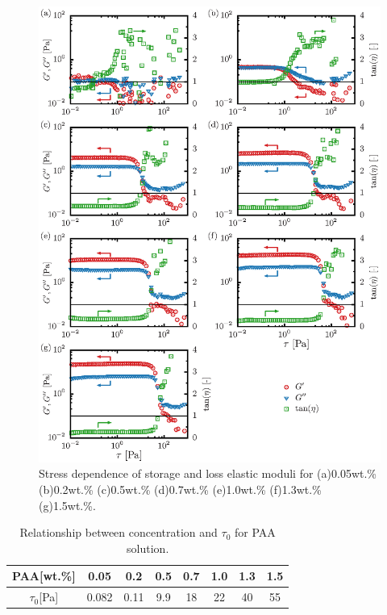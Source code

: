 \begin{figure}[ht]
	\centering
	\includegraphics[width=1\textwidth]{3-Physical_Property/elastic_modulus.eps}
	\caption{Stress dependence of storage and loss elastic moduli for (a)0.05wt.\% (b)0.2wt.\% (c)0.5wt.\% (d)0.7wt.\% (e)1.0wt.\% (f)1.3wt.\% (g)1.5wt.\%.}
	\label{fig:PAA-elast}
\end{figure}

\begin{table}[h]
	\centering
	\caption{Relationship between concentration and $\tau_0$ for PAA solution.}
	\label{table:PAA-tau0}
	\begin{tabular}{c|c|c|c|c|c|c|c} \hline
		PAA[wt.\%]   & 0.05  & 0.2  & 0.5 & 0.7 & 1.0 & 1.3 & 1.5 \\ \hline \hline
		$\tau_0$[Pa] & 0.082 & 0.11 & 9.9 & 18  & 22  & 40  & 55  \\ \hline
	\end{tabular}
\end{table}

